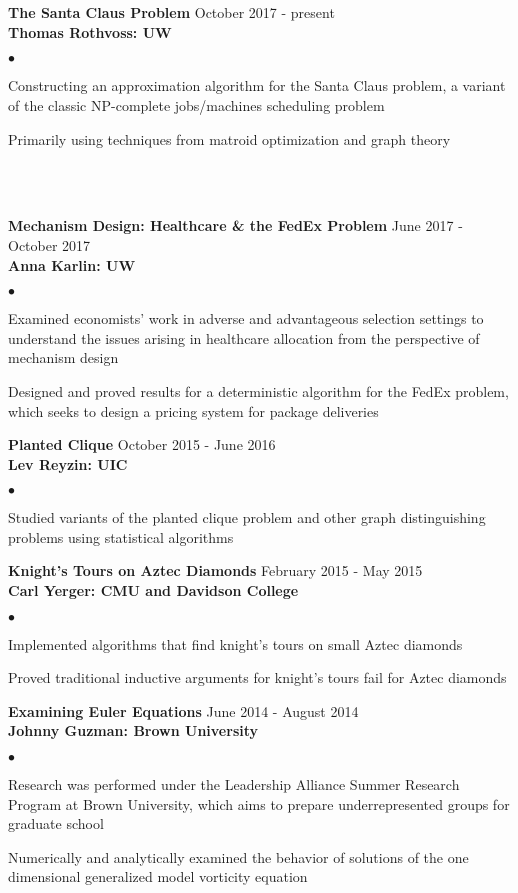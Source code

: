 \documentclass[12 pt]{article}
\newcommand{\lineunder}{\vspace*{-8pt} \\ \hspace*{-18pt} \hrulefill \\}
\newcommand{\header}[1]{{\hspace*{-15pt}\vspace*{6pt} \selectfont{\textsc{#1}}} \vspace*{-6pt} \lineunder}
\newcommand{\employer}[3]{{ \textbf{#1} \hfill #2\\ \textbf{#3}\\  }}
\newenvironment{achievements}{\begin{list}{$\bullet$}{\topsep 0pt \itemsep -2pt}}{\vspace*{4pt}\end{list}}
\begin{document}
\header{Current Projects}
\bigskip


\employer{The Santa Claus Problem}{October 2017 - present} {Thomas Rothvoss: UW}
\smallskip
	\begin{achievements}
		\item Constructing an approximation algorithm for the Santa Claus problem, a 
		variant of the classic NP-complete jobs/machines scheduling problem
		\item Primarily using techniques from matroid optimization and graph theory
	\end{achievements}	
\bigskip	


 \header{Past Projects}
 \bigskip

\employer{Mechanism Design: Healthcare \& the FedEx Problem }{June 2017 - October 2017} {Anna Karlin: UW}
\smallskip	
\begin{achievements}
		\item Examined economists' work in adverse and advantageous selection settings to understand the
		issues arising in healthcare allocation from the perspective of mechanism design 
		\item Designed and proved results for a deterministic algorithm for the FedEx problem, which seeks to design a pricing system for package deliveries
	\end{achievements}
\bigskip

\employer{Planted Clique}{October 2015 - June 2016} {Lev Reyzin: UIC}
\smallskip
	\begin{achievements}
		\item Studied variants of the planted clique problem and other graph distinguishing
		 problems using statistical algorithms
	\end{achievements}
\bigskip


\employer{Knight's Tours on Aztec Diamonds }{February 2015 - May 2015} {Carl Yerger: CMU and Davidson College}
\smallskip
	\begin{achievements}
		\item Implemented algorithms that find knight's tours on small Aztec diamonds
		\item Proved traditional inductive arguments for knight's tours fail for Aztec diamonds
	\end{achievements}
\bigskip


\employer{Examining Euler Equations }{June 2014 - August 2014} {Johnny Guzman: Brown University}
\smallskip

	\begin{achievements}
	\item Research was performed under the Leadership Alliance Summer Research Program at Brown University, which aims to prepare underrepresented groups for graduate school
	\item Numerically and analytically examined the behavior of solutions of the one dimensional generalized 
	model vorticity equation 
	\end{achievements}
\end{document}
